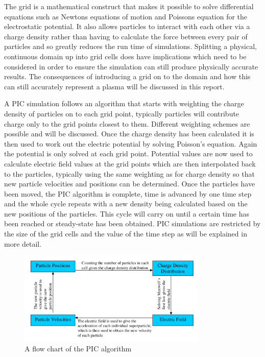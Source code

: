 The grid is a mathematical construct that makes it possible to solve differential equations such as Newtons equations of motion and Poissons equation for the electrostatic potential. It also allows particles to interact with each other via a charge density rather than having to calculate the force between every pair of particles and so greatly reduces the run time of simulations. Splitting a physical, continuous domain  up into grid cells does have implications which need to be considered in order to ensure the simulation can still produce physically accurate results. The consequences of introducing a grid on to the domain and how this can still accurately represent a plasma will be discussed in this report.

A PIC simulation follows an algorithm that starts with weighting the charge density of particles on to each grid point, typically particles will contribute charge only to the grid points closest to them. Different weighting schemes are possible and will be discussed. Once the charge density has been calculated it is then used to work out the electric potential by solving Poisson's equation. Again the potential is only solved at each grid point. Potential values are now used to calculate electric field values at the grid points which are then interpolated back to the particles, typically using the same weighting as for charge density so that new particle velocities and positions can be determined. Once the particles have been moved, the PIC algorithm is complete, time is advanced by one time step and the whole cycle repeats with a new density being calculated based on the new positions of the particles. This cycle will carry on until a certain time has been reached or steady-state has been obtained. PIC simulations are restricted by the size of the grid cells and the value of the time step as will be explained in more detail.
\begin{figure}[H]
\centering
\includegraphics[width=0.8\textwidth]{piccycle}
\caption{A flow chart of the PIC algorithm \cite{loop}}
\label{fig:Leapfrog}
\end{figure}


